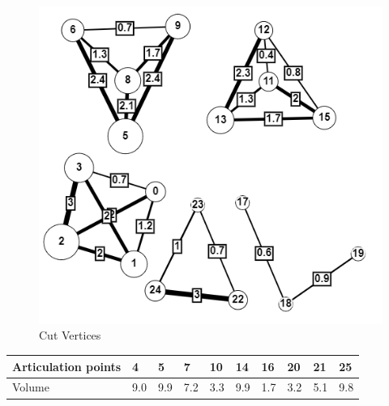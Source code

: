 \begin{figure}[htb!]
  \centering
  \includegraphics[width=\textwidth]{figures/cut_sample_2.png}
  \caption{Cut Vertices}
  \label{fig: cut_vertex}
\end{figure}

\begin{table}[htb!]
  \centering
  \begin{tabular}{|l|l|l|l|l|l|l|l|l|l|}
    \hline
    Articulation points & 4   & 5   & 7   & 10  & 14  & 16  & 20  & 21  & 25  \\ \hline
    Volume              & 9.0 & 9.9 & 7.2 & 3.3 & 9.9 & 1.7 & 3.2 & 5.1 & 9.8 \\ \hline
  \end{tabular}
\end{table}